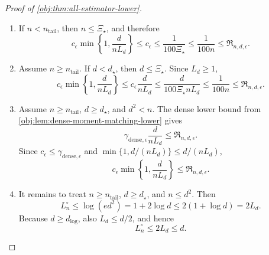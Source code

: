 \begin{proof}[Proof of \cref{obj:thm:all-estimator-lower}]
\begin{enumerate}
\item
If \(n<n_{\mathrm{tail}}\), then \(n\le\Xi_\star\), and therefore
\[
c_\epsilon\min\left\{1,\frac{d}{nL_d}\right\}
\le c_\epsilon
\le\frac{1}{100\Xi_\star}
\le\frac{1}{100n}
\le\mathfrak R_{n,d,\epsilon}.
\]

\item
Assume \(n\ge n_{\mathrm{tail}}\).  If \(d<d_\star\), then
\(d\le\Xi_\star\).  Since \(L_d\ge1\),
\[
c_\epsilon\min\left\{1,\frac{d}{nL_d}\right\}
\le
c_\epsilon\frac{d}{nL_d}
\le
\frac{d}{100\Xi_\star nL_d}
\le
\frac{1}{100n}
\le
\mathfrak R_{n,d,\epsilon}.
\]

\item
Assume \(n\ge n_{\mathrm{tail}}\), \(d\ge d_\star\), and \(d^2<n\).  The
dense lower bound from \cref{obj:lem:dense-moment-matching-lower} gives
\[
\gamma_{\mathrm{dense},\epsilon}\frac{d}{nL_d}
\le
\mathfrak R_{n,d,\epsilon}.
\]
Since \(c_\epsilon\le\gamma_{\mathrm{dense},\epsilon}\) and
\(\min\{1,d/(nL_d)\}\le d/(nL_d)\),
\[
c_\epsilon\min\left\{1,\frac{d}{nL_d}\right\}
\le
\mathfrak R_{n,d,\epsilon}.
\]

\item
It remains to treat \(n\ge n_{\mathrm{tail}}\), \(d\ge d_\star\), and
\(n\le d^2\).  Then
\[
L_n^\circ
\le
\log(ed^2)
=
1+2\log d
\le
2(1+\log d)
=
2L_d.
\]
Because \(d\ge d_{\log}\), also \(L_d\le d/2\), and hence
\[
L_n^\circ\le2L_d\le d.
\]


\end{enumerate}
\end{proof}
